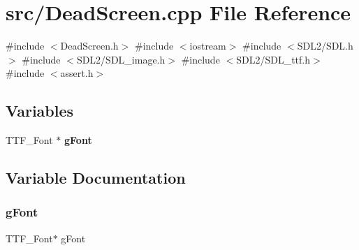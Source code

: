 \section{src/\+Dead\+Screen.cpp File Reference}
\label{_dead_screen_8cpp}
{\ttfamily \#include $<$Dead\+Screen.\+h$>$}\newline
{\ttfamily \#include $<$iostream$>$}\newline
{\ttfamily \#include $<$S\+D\+L2/\+S\+D\+L.\+h$>$}\newline
{\ttfamily \#include $<$S\+D\+L2/\+S\+D\+L\+\_\+image.\+h$>$}\newline
{\ttfamily \#include $<$S\+D\+L2/\+S\+D\+L\+\_\+ttf.\+h$>$}\newline
{\ttfamily \#include $<$assert.\+h$>$}\newline
\subsection*{Variables}
\begin{DoxyCompactItemize}
\item 
T\+T\+F\+\_\+\+Font $\ast$ \textbf{ g\+Font}
\end{DoxyCompactItemize}


\subsection{Variable Documentation}
\mbox{\label{_dead_screen_8cpp_a88e76957ec56f067af762125afcac25f}} 
\subsubsection{g\+Font}
{\footnotesize\ttfamily T\+T\+F\+\_\+\+Font$\ast$ g\+Font}

